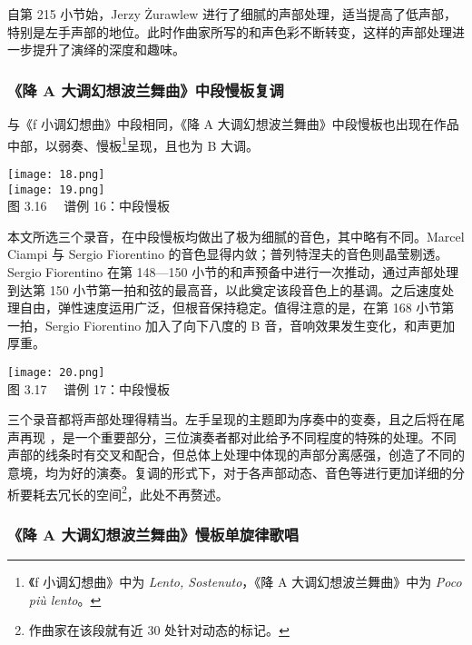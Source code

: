     自第 215 小节始，Jerzy Żurawlew 进行了细腻的声部处理，适当提高了低声部，特别是左手声部的地位。此时作曲家所写的和声色彩不断转变，这样的声部处理进一步提升了演绎的深度和趣味。

    \subsubsection{\heiti \fontsize{14}{16.8}\selectfont 《降 A 大调幻想波兰舞曲》中段慢板复调}

    与《f 小调幻想曲》中段相同，《降 A 大调幻想波兰舞曲》中段慢板也出现在作品中部，以弱奏、慢板\footnote{《f 小调幻想曲》中为 \textit{Lento, Sostenuto}，《降 A 大调幻想波兰舞曲》中为 \textit{Poco più lento}。}呈现，且也为 B 大调。

    \begin{center}
    \texttt{[image: 18.png]}\\
    \texttt{[image: 19.png]}\\
    \heiti \fontsize{10.5}{12.6}\selectfont 图 3.16 \ \ 谱例 16：中段慢板
    \end{center}

    本文所选三个录音，在中段慢板均做出了极为细腻的音色，其中略有不同。Marcel Ciampi 与 Sergio Fiorentino 的音色显得内敛；普列特涅夫的音色则晶莹剔透。Sergio Fiorentino 在第 148—150 小节的和声预备中进行一次推动，通过声部处理到达第 150 小节第一拍和弦的最高音，以此奠定该段音色上的基调。之后速度处理自由，弹性速度运用广泛，但根音保持稳定。值得注意的是，在第 168 小节第一拍，Sergio Fiorentino 加入了向下八度的 B 音，音响效果发生变化，和声更加厚重。

    \begin{center}
    \texttt{[image: 20.png]}\\
    \heiti \fontsize{10.5}{12.6}\selectfont 图 3.17 \ \ 谱例 17：中段慢板
    \end{center}

    三个录音都将声部处理得精当。左手呈现的主题即为序奏中的变奏，且之后将在尾声再现 \cite{cwu}，是一个重要部分，三位演奏者都对此给予不同程度的特殊的处理。不同声部的线条时有交叉和配合，但总体上处理中体现的声部分离感强，创造了不同的意境，均为好的演奏。复调的形式下，对于各声部动态、音色等进行更加详细的分析要耗去冗长的空间\footnote{作曲家在该段就有近 30 处针对动态的标记。}，此处不再赘述。


    \subsubsection{\heiti \fontsize{14}{16.8}\selectfont 《降 A 大调幻想波兰舞曲》慢板单旋律歌唱}


